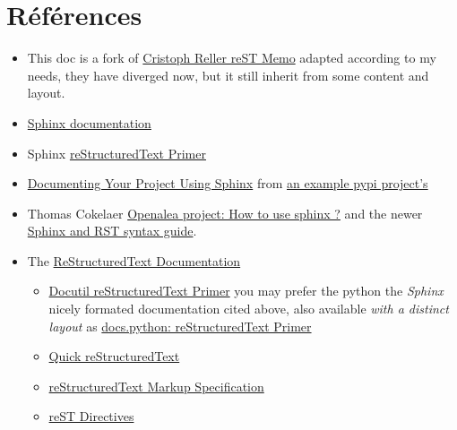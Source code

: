 \documentclass[a4paper,11pt,french]{rtdsphinxmanual}
\begin{document}
\chapter{Références}
\label{references:references}\label{references::doc}\begin{itemize}
\item {} 
This doc is a fork of \href{http://aert-notes-dev.readthedocs.org/en/latest/content/rest/}{Cristoph Reller reST Memo}
adapted according to my needs, they have diverged now, but it still
inherit from some content and layout.

\item {} 
\href{http://sphinx.pocoo.org/latest/contents.html}{Sphinx documentation}

\item {} 
Sphinx \href{http://sphinx.pocoo.org/latest/rest.html}{reStructuredText Primer}

\item {} 
\href{http://packages.python.org/an\_example\_pypi\_project/sphinx.html}{Documenting Your Project Using
Sphinx}
from \href{http://packages.python.org/an\_example\_pypi\_project/}{an example pypi project’s}

\item {} 
Thomas Cokelaer \href{http://openalea.gforge.inria.fr/doc/openalea/doc/\_build/html/source/sphinx/sphinx.html}{Openalea project: How to use sphinx ?}
and the newer
\href{http://thomas-cokelaer.info/tutorials/sphinx/contents.html}{Sphinx and RST syntax guide}.

\item {} 
The \href{http://docutils.sourceforge.net/docs/}{ReStructuredText Documentation}
\begin{itemize}
\item {} 
\href{http://docutils.sourceforge.net/docs/user/rst/quickstart.html}{Docutil reStructuredText Primer}
you may prefer the python the \emph{Sphinx} nicely formated
documentation cited above, also available \emph{with a distinct layout} as
\href{http://docs.python.org/dev/documenting/rest.html}{docs.python: reStructuredText Primer}

\item {} 
\href{http://docutils.sourceforge.net/docs/ref/rst/quick.html}{Quick reStructuredText}

\item {} 
\href{http://docutils.sourceforge.net/docs/ref/rst/restructuredtext.html}{reStructuredText Markup Specification}

\item {} 
\href{http://docutils.sourceforge.net/docs/ref/rst/directives.html}{reST Directives}


\end{itemize}
\end{itemize}
\end{document}
